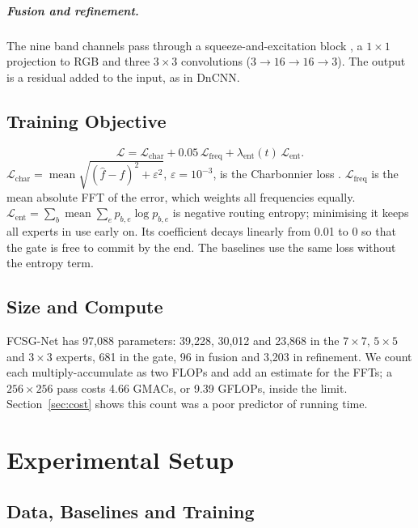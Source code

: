 \documentclass[12pt,a4paper,oneside]{NITR}
\newcommand{\fcsg}{FCSG-Net}
\begin{document}
\paragraph{Fusion and refinement.} The nine band channels pass through a
squeeze-and-excitation block \cite{hu2018se}, a $1\times1$ projection to RGB
and three $3\times3$ convolutions ($3\to16\to16\to3$). The output is a
residual added to the input, as in DnCNN.

\section{Training Objective}\label{sec:loss}

\begin{equation}
	\mathcal{L}=\mathcal{L}_\text{char}+0.05\,\mathcal{L}_\text{freq}+\lambda_\text{ent}(t)\,\mathcal{L}_\text{ent}.
\end{equation}
$\mathcal{L}_\text{char}=\operatorname{mean}\sqrt{(\hat f-f)^2+\varepsilon^2}$,
$\varepsilon=10^{-3}$, is the Charbonnier loss \cite{charbonnier1994}.
$\mathcal{L}_\text{freq}$ is the mean absolute FFT of the error, which weights
all frequencies equally. $\mathcal{L}_\text{ent}=\sum_b\operatorname{mean}
\sum_e p_{b,e}\log p_{b,e}$ is negative routing entropy; minimising it keeps
all experts in use early on. Its coefficient decays linearly from 0.01 to 0
so that the gate is free to commit by the end. The baselines use the same
loss without the entropy term.

\section{Size and Compute}\label{sec:size}

\fcsg{} has 97,088 parameters: 39,228, 30,012 and 23,868 in the $7\times7$,
$5\times5$ and $3\times3$ experts, 681 in the gate, 96 in fusion and 3,203 in
refinement. We count each multiply-accumulate as two FLOPs and add an
estimate for the FFTs; a $256\times256$ pass costs 4.66 GMACs, or 9.39
GFLOPs, inside the limit. Section~\ref{sec:cost} shows this count was a poor
predictor of running time.


\chapter{Experimental Setup}\label{ch:setup}

\section{Data, Baselines and Training}\label{sec:training}
\end{document}

